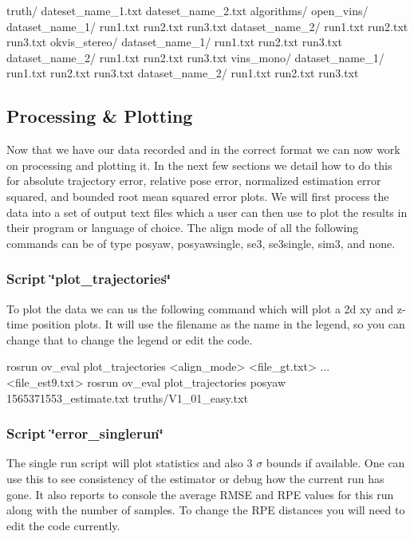 \begin{DoxyCode}
truth/
    dateset\_name\_1.txt
    dateset\_name\_2.txt
algorithms/
    open\_vins/
        dataset\_name\_1/
            run1.txt
            run2.txt
            run3.txt
        dataset\_name\_2/
            run1.txt
            run2.txt
            run3.txt
    okvis\_stereo/
        dataset\_name\_1/
            run1.txt
            run2.txt
            run3.txt
        dataset\_name\_2/
            run1.txt
            run2.txt
            run3.txt
    vins\_mono/
        dataset\_name\_1/
            run1.txt
            run2.txt
            run3.txt
        dataset\_name\_2/
            run1.txt
            run2.txt
            run3.txt
\end{DoxyCode}
\hypertarget{eval-error_eval-ov-plot}{}\subsection{Processing \& Plotting}\label{eval-error_eval-ov-plot}
Now that we have our data recorded and in the correct format we can now work on processing and plotting it. In the next few sections we detail how to do this for absolute trajectory error, relative pose error, normalized estimation error squared, and bounded root mean squared error plots. We will first process the data into a set of output text files which a user can then use to plot the results in their program or language of choice. The align mode of all the following commands can be of type {\ttfamily posyaw}, {\ttfamily posyawsingle}, {\ttfamily se3}, {\ttfamily se3single}, {\ttfamily sim3}, and {\ttfamily none}.\hypertarget{eval-error_eval-ov-plot-plot}{}\subsubsection{Script \char`\"{}plot\+\_\+trajectories\char`\"{}}\label{eval-error_eval-ov-plot-plot}
To plot the data we can us the following command which will plot a 2d xy and z-\/time position plots. It will use the filename as the name in the legend, so you can change that to change the legend or edit the code.


\begin{DoxyCode}
rosrun ov\_eval plot\_trajectories <align\_mode> <file\_gt.txt> ... <file\_est9.txt>
rosrun ov\_eval plot\_trajectories posyaw 1565371553\_estimate.txt truths/V1\_01\_easy.txt
\end{DoxyCode}


 \hypertarget{eval-error_eval-ov-plot-singlerun}{}\subsubsection{Script \char`\"{}error\+\_\+singlerun\char`\"{}}\label{eval-error_eval-ov-plot-singlerun}
The single run script will plot statistics and also 3 $\sigma$ bounds if available. One can use this to see consistency of the estimator or debug how the current run has gone. It also reports to console the average R\+M\+SE and R\+PE values for this run along with the number of samples. To change the R\+PE distances you will need to edit the code currently.


